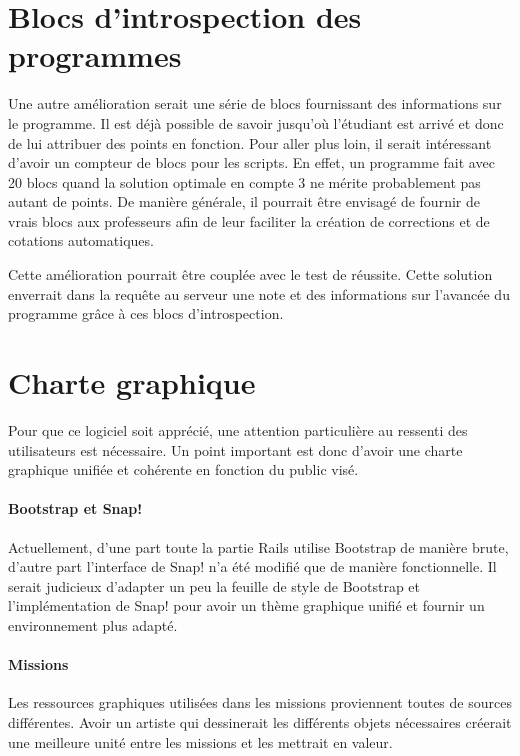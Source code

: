 \section{Blocs d'introspection des programmes}
Une autre amélioration serait une série de \glspl{bloc} fournissant des informations sur le programme. Il est déjà possible de savoir jusqu'où l'étudiant est arrivé et donc de lui attribuer des points en fonction. 
Pour aller plus loin, il serait intéressant d'avoir un compteur de \glspl{bloc} pour les \glspl{script}. En effet, un programme fait avec 20 \glspl{bloc} quand la solution optimale en compte 3 ne mérite probablement pas autant de points.
De manière générale, il pourrait être envisagé de fournir de vrais \glspl{bloc} aux professeurs afin de leur faciliter la création de corrections et de cotations automatiques.

Cette amélioration pourrait être couplée avec le test de réussite. Cette solution enverrait dans la requête au serveur une note et des informations sur l'avancée du programme grâce à ces blocs d'introspection.

\section{Charte graphique}
Pour que ce logiciel soit apprécié, une attention particulière au ressenti des utilisateurs est nécessaire. Un point important est donc d'avoir une charte graphique unifiée et cohérente en fonction du public visé.

\paragraph{Bootstrap et Snap!}
Actuellement, d'une part toute la partie Rails utilise Bootstrap de manière brute, d'autre part l'interface de Snap! n'a été modifié que de manière fonctionnelle. Il serait judicieux d'adapter un peu la feuille de style de Bootstrap et l'implémentation de Snap! pour avoir un thème graphique unifié et fournir un environnement plus adapté.

\paragraph{Missions}
Les ressources graphiques utilisées dans les \glspl{mission} proviennent toutes de sources différentes. Avoir un artiste qui dessinerait les différents objets nécessaires créerait une meilleure unité entre les \glspl{mission} et les mettrait en valeur.


% 
% 
% 
% 
% 
% 
